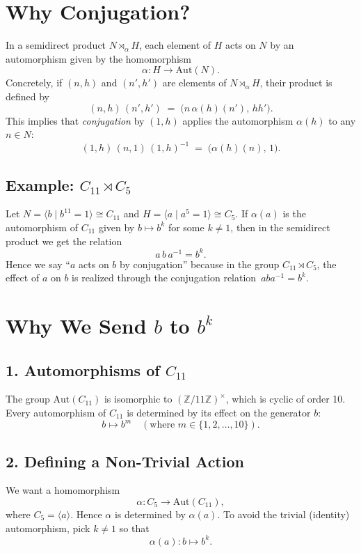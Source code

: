\documentclass[12pt]{article}
\theoremstyle{definition} %
\theoremstyle{plain} %
\begin{document}
\section*{Why Conjugation?}

In a semidirect product $N \rtimes_\alpha H$, each element of $H$ acts on $N$
by an automorphism given by the homomorphism
\[
  \alpha : H \to \mathrm{Aut}(N).
\]
Concretely, if $(n,h)$ and $(n',h')$ are elements of $N \rtimes_\alpha H$, 
their product is defined by
\[
  (n,h)\,(n',h')
  \;=\;
  \bigl(n\,\alpha(h)(n'),\,h h'\bigr).
\]
This implies that \emph{conjugation} by $(1,h)$ applies the automorphism 
$\alpha(h)$ to any $n \in N$:
\[
  (1,h)\,(n,1)\,(1,h)^{-1} 
  \;=\;
  \bigl(\alpha(h)(n),\,1\bigr).
\]

\subsection*{Example: \(C_{11} \rtimes C_{5}\)}
Let $N = \langle b \mid b^{11} = 1\rangle \cong C_{11}$ 
and $H = \langle a \mid a^5 = 1\rangle \cong C_{5}$. 
If $\alpha(a)$ is the automorphism of $C_{11}$ given by $b \mapsto b^k$ for 
some $k \neq 1$, then in the semidirect product we get the relation
\[
  a\,b\,a^{-1} = b^k.
\]
Hence we say ``$a$ acts on $b$ by conjugation'' because in the group $C_{11} \rtimes C_{5}$, 
the effect of $a$ on $b$ is realized through the conjugation relation 
\(\,a b a^{-1} = b^k.\)

\section*{Why We Send \(b\) to \(b^k\)}

\subsection*{1. Automorphisms of \(C_{11}\)}
The group \(\mathrm{Aut}(C_{11})\) is isomorphic to \((\mathbb{Z}/11\mathbb{Z})^\times\), 
which is cyclic of order 10. Every automorphism of \(C_{11}\) is determined by its 
effect on the generator \(b\):
\[
b \mapsto b^m
\quad (\text{where } m \in \{1,2,\dots,10\}).
\]

\subsection*{2. Defining a Non-Trivial Action}
We want a homomorphism 
\[
\alpha: C_{5} \to \mathrm{Aut}(C_{11}),
\]
where \(C_5 = \langle a \rangle\). Hence \(\alpha\) is determined by \(\alpha(a)\). 
To avoid the trivial (identity) automorphism, pick \(k \neq 1\) so that
\[
\alpha(a): b \mapsto b^k.
\]
\end{document}

